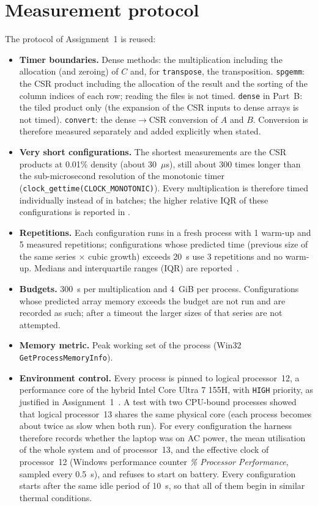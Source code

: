 \documentclass[12pt,a4paper]{report}
\begin{document}
\section{Measurement protocol}

The protocol of Assignment~1 is reused:
\begin{itemize}
  \item \textbf{Timer boundaries.} Dense methods: the multiplication including the allocation (and zeroing) of $C$
  and, for \texttt{transpose}, the transposition. \texttt{spgemm}: the CSR product including the allocation of the
  result and the sorting of the column indices of each row; reading the files is not timed. \texttt{dense} in Part~B:
  the tiled product only (the expansion of the CSR inputs to dense arrays is not timed). \texttt{convert}: the
  dense$\to$CSR conversion of $A$ and $B$. Conversion is therefore measured separately and added explicitly when
  stated.
  \item \textbf{Very short configurations.} The shortest measurements are the CSR products at 0.01\% density (about
  30~$\mu$s), still about 300 times longer than the sub-microsecond resolution of the monotonic timer
  (\texttt{clock\_gettime(CLOCK\_MONOTONIC)}). Every multiplication is therefore timed individually instead of in
  batches; the higher relative IQR of these configurations is reported in .
  \item \textbf{Repetitions.} Each configuration runs in a fresh process with 1 warm-up and 5 measured repetitions;
  configurations whose predicted time (previous size of the same series $\times$ cubic growth) exceeds 20~s use
  3 repetitions and no warm-up. Medians and interquartile ranges (IQR) are reported~\cite{hoefler2015}.
  \item \textbf{Budgets.} 300~s per multiplication and 4~GiB per process. Configurations whose predicted array memory
  exceeds the budget are not run and are recorded as such; after a timeout the larger sizes of that series are not
  attempted.
  \item \textbf{Memory metric.} Peak working set of the process (Win32 \texttt{GetProcessMemoryInfo}).
  \item \textbf{Environment control.} Every process is pinned to logical processor~12, a performance core of the
  hybrid Intel Core Ultra 7 155H, with \texttt{HIGH} priority, as justified in Assignment~1~\cite{a1}. A test with two
  CPU-bound processes showed that logical processor~13 shares the same physical core (each process becomes about
  twice as slow when both run). For every configuration the harness therefore records whether the laptop was on AC
  power, the mean utilisation of the whole system and of processor~13, and the effective clock of processor~12 (Windows
performance counter \textit{\% Processor Performance}, sampled every 0.5~s), and refuses to start on battery. Every
configuration starts after the same idle period of 10~s, so that all of them begin in similar thermal conditions.
\end{itemize}
\end{document}

